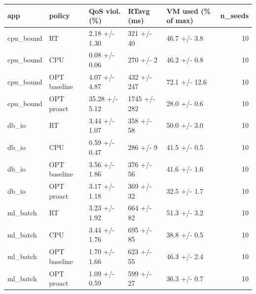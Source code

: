 \begin{tabular}{lllllr}
\toprule
app & policy & QoS viol. (\%) & RTavg (ms) & VM used (\% of max) & n\_seeds \\
\midrule
cpu\_bound & RT & 2.18 +/- 1.30 & 321 +/- 40 & 46.7 +/- 3.8 & 10 \\
cpu\_bound & CPU & 0.08 +/- 0.06 & 270 +/- 2 & 46.2 +/- 0.8 & 10 \\
cpu\_bound & OPT baseline & 4.07 +/- 4.87 & 432 +/- 247 & 72.1 +/- 12.6 & 10 \\
cpu\_bound & OPT proact & 35.28 +/- 5.12 & 1745 +/- 282 & 28.0 +/- 0.6 & 10 \\
db\_io & RT & 3.44 +/- 1.07 & 358 +/- 58 & 50.0 +/- 3.0 & 10 \\
db\_io & CPU & 0.59 +/- 0.47 & 286 +/- 9 & 41.5 +/- 0.5 & 10 \\
db\_io & OPT baseline & 3.56 +/- 1.86 & 376 +/- 56 & 41.6 +/- 1.6 & 10 \\
db\_io & OPT proact & 3.17 +/- 1.18 & 369 +/- 32 & 32.5 +/- 1.7 & 10 \\
ml\_batch & RT & 3.23 +/- 1.92 & 664 +/- 82 & 51.3 +/- 3.2 & 10 \\
ml\_batch & CPU & 3.44 +/- 1.76 & 695 +/- 85 & 38.8 +/- 0.5 & 10 \\
ml\_batch & OPT baseline & 1.70 +/- 1.66 & 623 +/- 55 & 46.3 +/- 2.4 & 10 \\
ml\_batch & OPT proact & 1.09 +/- 0.59 & 599 +/- 27 & 36.3 +/- 0.7 & 10 \\
\bottomrule
\end{tabular}
